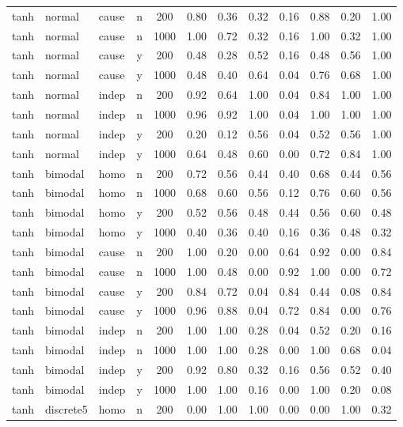 \begin{longtable}{@{}lllccccccccc@{}}
tanh & normal & cause & n & 200 & 0.80 & 0.36 & 0.32 & 0.16 & 0.88 & 0.20 & 1.00\\
tanh & normal & cause & n & 1000 & 1.00 & 0.72 & 0.32 & 0.16 & 1.00 & 0.32 & 1.00\\
tanh & normal & cause & y & 200 & 0.48 & 0.28 & 0.52 & 0.16 & 0.48 & 0.56 & 1.00\\
tanh & normal & cause & y & 1000 & 0.48 & 0.40 & 0.64 & 0.04 & 0.76 & 0.68 & 1.00\\
tanh & normal & indep & n & 200 & 0.92 & 0.64 & 1.00 & 0.04 & 0.84 & 1.00 & 1.00\\
tanh & normal & indep & n & 1000 & 0.96 & 0.92 & 1.00 & 0.04 & 1.00 & 1.00 & 1.00\\
tanh & normal & indep & y & 200 & 0.20 & 0.12 & 0.56 & 0.04 & 0.52 & 0.56 & 1.00\\
tanh & normal & indep & y & 1000 & 0.64 & 0.48 & 0.60 & 0.00 & 0.72 & 0.84 & 1.00\\
tanh & bimodal & homo & n & 200 & 0.72 & 0.56 & 0.44 & 0.40 & 0.68 & 0.44 & 0.56\\
tanh & bimodal & homo & n & 1000 & 0.68 & 0.60 & 0.56 & 0.12 & 0.76 & 0.60 & 0.56\\
tanh & bimodal & homo & y & 200 & 0.52 & 0.56 & 0.48 & 0.44 & 0.56 & 0.60 & 0.48\\
tanh & bimodal & homo & y & 1000 & 0.40 & 0.36 & 0.40 & 0.16 & 0.36 & 0.48 & 0.32\\
tanh & bimodal & cause & n & 200 & 1.00 & 0.20 & 0.00 & 0.64 & 0.92 & 0.00 & 0.84\\
tanh & bimodal & cause & n & 1000 & 1.00 & 0.48 & 0.00 & 0.92 & 1.00 & 0.00 & 0.72\\
tanh & bimodal & cause & y & 200 & 0.84 & 0.72 & 0.04 & 0.84 & 0.44 & 0.08 & 0.84\\
tanh & bimodal & cause & y & 1000 & 0.96 & 0.88 & 0.04 & 0.72 & 0.84 & 0.00 & 0.76\\
tanh & bimodal & indep & n & 200 & 1.00 & 1.00 & 0.28 & 0.04 & 0.52 & 0.20 & 0.16\\
tanh & bimodal & indep & n & 1000 & 1.00 & 1.00 & 0.28 & 0.00 & 1.00 & 0.68 & 0.04\\
tanh & bimodal & indep & y & 200 & 0.92 & 0.80 & 0.32 & 0.16 & 0.56 & 0.52 & 0.40\\
tanh & bimodal & indep & y & 1000 & 1.00 & 1.00 & 0.16 & 0.00 & 1.00 & 0.20 & 0.08\\
tanh & discrete5 & homo & n & 200 & 0.00 & 1.00 & 1.00 & 0.00 & 0.00 & 1.00 & 0.32\\

\end{longtable}
